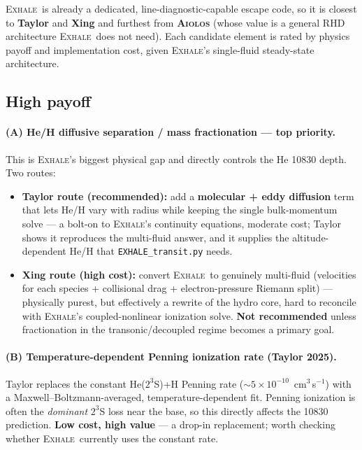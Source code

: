 \documentclass[11pt]{article}
\newcommand{\EXHALE}{\textsc{Exhale}}
\newcommand{\AIOLOS}{\textsc{Aiolos}}
\begin{document}
\EXHALE\ is already a dedicated, line-diagnostic-capable escape code, so it is closest to
\textbf{Taylor} and \textbf{Xing} and furthest from \textbf{\AIOLOS} (whose value is a
general RHD architecture \EXHALE\ does not need). Each candidate element is rated by physics
payoff and implementation cost, given \EXHALE's single-fluid steady-state architecture.

\subsection{High payoff}

\paragraph{(A) He/H diffusive separation / mass fractionation --- top priority.}
This is \EXHALE's biggest physical gap and directly controls the He 10830 depth. Two routes:
\begin{itemize}[nosep]
  \item \textbf{Taylor route (recommended):} add a \textbf{molecular + eddy diffusion} term
    that lets He/H vary with radius while keeping the single bulk-momentum solve --- a
    bolt-on to \EXHALE's continuity equations, moderate cost; Taylor shows it reproduces the
    multi-fluid answer, and it supplies the altitude-dependent He/H that \texttt{EXHALE\_transit.py}
    needs.
  \item \textbf{Xing route (high cost):} convert \EXHALE\ to genuinely multi-fluid
    (velocities for each species + collisional drag + electron-pressure Riemann split) ---
    physically purest, but effectively a rewrite of the hydro core, hard to reconcile with
    \EXHALE's coupled-nonlinear ionization solve. \textbf{Not recommended} unless
    fractionation in the transonic/decoupled regime becomes a primary goal.
\end{itemize}

\paragraph{(B) Temperature-dependent Penning ionization rate (Taylor 2025).}
Taylor replaces the constant He($2^3$S)+H Penning rate ($\sim5\times10^{-10}$~cm$^3$\,s$^{-1}$)
with a Maxwell--Boltzmann-averaged, temperature-dependent fit. Penning ionization is often
the \emph{dominant} $2^3$S loss near the base, so this directly affects the 10830 prediction.
\textbf{Low cost, high value} --- a drop-in replacement; worth checking whether \EXHALE\
currently uses the constant rate.
\end{document}
